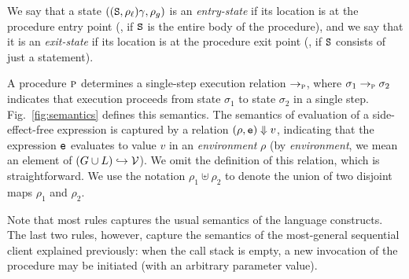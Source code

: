 We say that a state $((\texttt{S},\rho_\ell)\gamma,\rho_g)$ is an \emph{entry-state}
if its location is at 
the procedure entry point (\ie, if $\texttt{S}$ is the entire body of the procedure),
and we say that it is an \emph{exit-state} if its location is at the procedure exit point
(\ie, if $\texttt{S}$ consists of just a  statement).

A procedure $\textsc{p}$ determines a single-step execution relation
$\rightarrow_{\textsc{p}}$, where $\sigma_1 \rightarrow_{\textsc{p}} \sigma_2$ indicates that
execution proceeds from state $\sigma_1$ to state $\sigma_2$ in a single
step.  Fig.~\ref{fig:semantics} defines this semantics.  The semantics of
evaluation of a side-effect-free expression is captured by a relation
$({\rho},{\texttt{e}}) \Downarrow {v}$, indicating that the expression $\texttt{e}$
evaluates to value $v$ in an \emph{environment} $\rho$ (by
\emph{environment}, we mean an
element of  $(G \cup L) \hookrightarrow \mathcal{V}$).  We omit the definition of this
relation, which is straightforward.  We use the notation $\rho_1 \uplus
\rho_2$ to denote the union of two disjoint maps $\rho_1$ and $\rho_2$.


Note that most rules captures the usual semantics of the language constructs.
The last two rules, however, capture the semantics of the most-general sequential
client explained previously: when the call stack is empty, a new invocation of
the procedure may be initiated (with an arbitrary parameter value).


